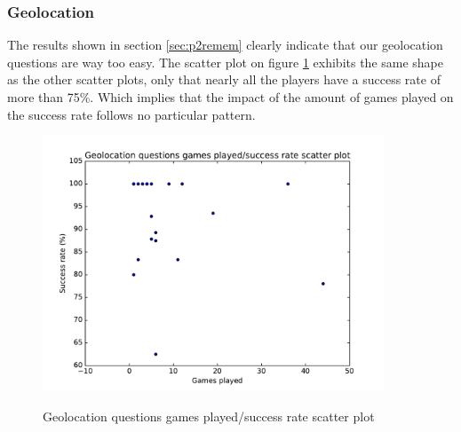 \subsubsection{Geolocation}
The results shown in section \ref{sec:p2remem} clearly indicate that our geolocation questions are way too easy. The scatter plot on figure \ref{fig:geoScatter} exhibits the same shape as the other scatter plots, only that nearly all the players have a success rate of more than 75\%. Which implies that the impact of the amount of games played on the success rate follows no particular pattern.

\begin{figure}
\centering
{\includegraphics[width=4in]{images/geo_scatter.pdf}}
\caption{Geolocation questions games played/success rate scatter plot}
\label{fig:geoScatter}
\end{figure}

